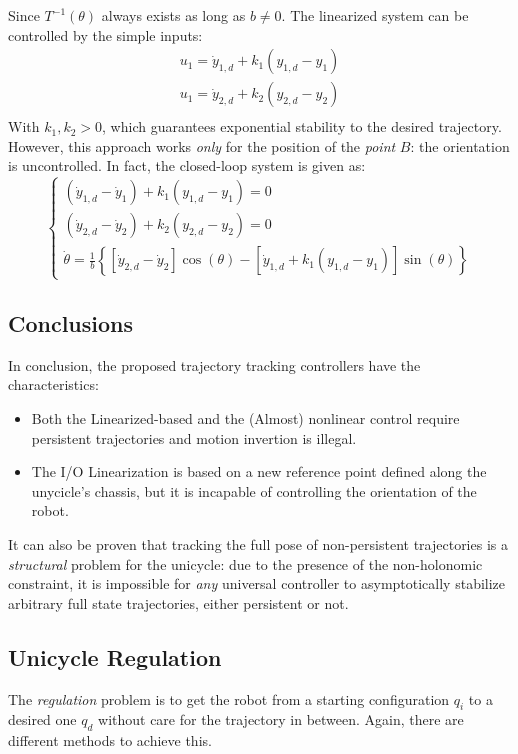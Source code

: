 Since $T^{-1}(\theta)$ always exists as long as $b\neq0$. The linearized system can be controlled by the simple inputs:
\begin{gather*}
    u_1 = \dot{y}_{1,d}+k_1(y_{1,d}-y_1) \\
    u_1 = \dot{y}_{2,d}+k_2(y_{2,d}-y_2) \\
\end{gather*}
With $k_1,k_2>0$, which guarantees exponential stability to the desired trajectory. However, this approach works \textit{only} for the position of the \textit{point} $B$: the orientation is uncontrolled. In fact, the closed-loop system is given as:
\begin{equation*}
    \begin{cases}
        (\dot{y}_{1,d}-\dot{y}_{1})+k_1(y_{1,d}-y_1)=0\\
        (\dot{y}_{2,d}-\dot{y}_{2})+k_2(y_{2,d}-y_2)=0\\
        \dot{\theta}= \frac{1}{b}\left\{\left[\dot{y}_{2,d}-\dot{y}_{2}\right]\cos(\theta)-\left[\dot{y}_{1,d}+k_1(y_{1,d}-y_1)\right]\sin(\theta)\right\}
    \end{cases}
\end{equation*}
\subsection{Conclusions}
In conclusion, the proposed trajectory tracking controllers have the characteristics:
\begin{itemize}
    \item Both the Linearized-based and the (Almost) nonlinear control require persistent trajectories and motion invertion is illegal.
    \item The I/O Linearization is based on a new reference point defined along the unycicle's chassis, but it is incapable of controlling the orientation of the robot.
\end{itemize}
It can also be proven that tracking the full pose of non-persistent trajectories is a \textit{structural} problem for the unicycle: due to the presence of the non-holonomic constraint, it is impossible for \textit{any} universal controller to asymptotically stabilize arbitrary full state trajectories, either persistent or not.
\subsection{Unicycle Regulation}
The \textit{regulation} problem is to get the robot from a starting configuration $q_i$ to a desired one $q_d$ without care for the trajectory in between. Again, there are different methods to achieve this.
